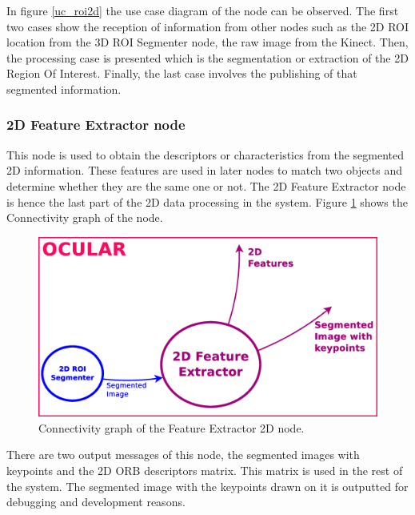 	In figure \ref{uc_roi2d} the use case diagram of the node can be observed.
	The first two cases show the reception of information from other nodes such as the 2D ROI location from the 3D ROI Segmenter node, the raw image from the Kinect. 
	Then, the processing case is presented which is the segmentation or extraction of the 2D Region Of Interest. 
	Finally, the last case involves the publishing of that segmented information. 

\subsubsection{2D Feature Extractor node}
\label{fe2d}
	This node is used to obtain the descriptors or characteristics from the segmented 2D information. 
	These features are used in later nodes to match two objects and determine whether they are the same one or not. 
	The 2D Feature Extractor node is hence the last part of the 2D data processing in the system. 
	Figure \ref{node_fe2d} shows the Connectivity graph of the node. 

		\begin{figure}[H]
			\begin{center}
			\includegraphics[width=0.5\linewidth]{img/diagrams/node_fe2d.eps}
			\caption[Feature Extractor 2D node I/O]{Connectivity graph of the Feature Extractor 2D node.}		
			\label{node_fe2d}
			\end{center}
		\end{figure}

	There are two output messages of this node, the segmented images with keypoints and the 2D ORB descriptors matrix. 
	This matrix is used in the rest of the system. 
	The segmented image with the keypoints drawn on it is outputted for debugging and development reasons. 
	\\

